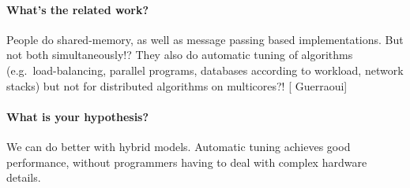 \documentclass{article}
\newcommand{\stefan}[1]{
  {\color{skRed}[{\color{red}{SK}} #1]}}
\begin{document}
\paragraph{What's the related work?}
People do shared-memory, as well as message passing based
implementations. But not both simultaneously!? They also do automatic
tuning of algorithms (e.g.\ load-balancing,
parallel programs, databases according to workload, network stacks)
but not for distributed algorithms on multicores?! \stefan{Guerraoui}

\paragraph{What is your hypothesis?}
We can do better with hybrid models. Automatic tuning achieves good
performance, without programmers having to deal with complex hardware details.
\end{document}
